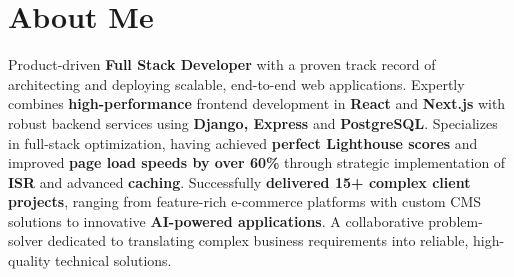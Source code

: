 \section{About Me}

Product-driven \textbf{Full Stack Developer} with a proven track record of architecting and deploying scalable, end-to-end web applications. Expertly combines \textbf{high-performance} frontend development in \textbf{React} and \textbf{Next.js} with robust backend services using \textbf{Django, Express} and \textbf{PostgreSQL}. Specializes in full-stack optimization, having achieved \textbf{perfect Lighthouse scores} and improved \textbf{page load speeds by over 60\%} through strategic implementation of \textbf{ISR} and advanced \textbf{caching}. Successfully \textbf{delivered 15+ complex client projects}, ranging from feature-rich e-commerce platforms with custom CMS solutions to innovative \textbf{AI-powered applications}. A collaborative problem-solver dedicated to translating complex business requirements into reliable, high-quality technical solutions.
